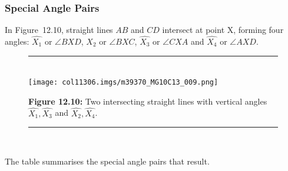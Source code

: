             \subsubsection{ Special Angle Pairs}
            \nopagebreak
        \label{m39370*id315274}In Figure~12.10, straight lines $AB$ and $CD$ intersect at point X, forming four angles: $\hat{{X}_{1}}$ or $\angle BXD$\hspace{1ex}, $\hat{{X}_{2}}$\hspace{1ex} or $\angle BXC$\hspace{1ex}, $\hat{{X}_{3}}$\hspace{1ex} or $\angle CXA$\hspace{1ex} and $\hat{{X}_{4}}$\hspace{1ex} or $\angle AXD$\hspace{1ex}.\par 
    \setcounter{subfigure}{0}
	\begin{figure}[H] %
    \begin{center}
    \rule[.1in]{\figurerulewidth}{.005in} \\
        \label{m39370*uid27!!!underscore!!!media}\label{m39370*uid27!!!underscore!!!printimage}\texttt{[image: col11306.imgs/m39370\_MG10C13\_009.png]} %
      \vspace{2pt}
    \vspace{\rubberspace}\par \begin{cnxcaption}
	  \small \textbf{Figure 12.10: }Two intersecting straight lines with vertical angles $\hat{{X}_{1}},\hat{{X}_{3}}$ and $\hat{{X}_{2}},\hat{{X}_{4}}$.
	\end{cnxcaption}
    \vspace{.1in}
    \rule[.1in]{\figurerulewidth}{.005in} \\
    \end{center}
 \end{figure}       
        \label{m39370*id315545}The table summarises the special angle pairs that result.\par 
